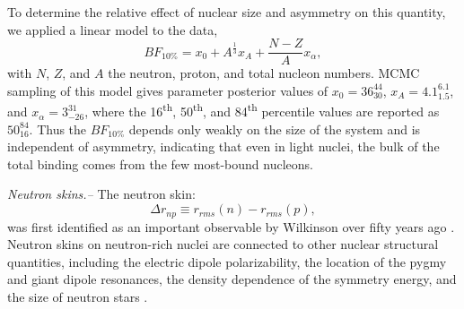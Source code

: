 \documentclass[twocolumn,secnumarabic,amssymb, nobibnotes, aps, prl, superscriptaddress, nobalancelastpage]{revtex4-1}
\begin{document}
To determine the relative effect of nuclear size and asymmetry on this
quantity, we applied a linear model to the data,
\begin{equation}\label{BernieFractionModel}
    BF_{10\%} = x_{0} + A^{\frac{1}{3}} x_{A} + \frac{N-Z}{A}
        x_{\alpha},
\end{equation}
with $N$, $Z$, and $A$ the neutron, proton, and total nucleon numbers. MCMC sampling of this
model gives parameter posterior values of $x_{0} = 36^{44}_{30}$, $x_{A} =
4.1^{6.1}_{1.5}$, and $x_{\alpha} = 3^{31}_{-26}$, where the 16\textsuperscript{th},
50\textsuperscript{th}, and 84\textsuperscript{th} percentile values are reported as $\text{50}^{\text{84}}_{\text{16}}$.
Thus the $BF_{10\%}$ depends only weakly on
the size of the system and is independent of asymmetry, indicating
that even in light nuclei, the bulk of the total binding comes from the few most-bound nucleons.

\textit{Neutron skins.--}
The neutron skin:
\begin{equation}
    \Delta r_{np} \equiv r_{rms}(n) - r_{rms}(p),
\end{equation}
was first identified as an important observable
by Wilkinson over fifty years ago \cite{Wilkinson1967}. Neutron skins on neutron-rich
nuclei are connected to other nuclear structural quantities,
including the electric dipole polarizability, the location of the pygmy and giant
dipole resonances, the density dependence of the symmetry energy,
and the size of neutron stars \cite{Vinas2014, Brown2000, Fattoyev2012, Zhang2018, TypelBrown2001}.
\end{document}
